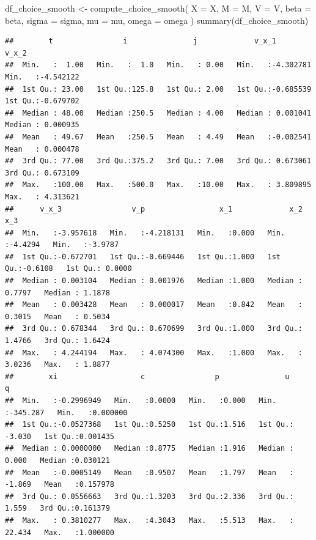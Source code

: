 \documentclass[
]{book}
\newenvironment{Shaded}{\begin{snugshade}}{\end{snugshade}}
\newcommand{\AttributeTok}[1]{\textcolor[rgb]{0.77,0.63,0.00}{#1}}
\newcommand{\FunctionTok}[1]{\textcolor[rgb]{0.00,0.00,0.00}{#1}}
\newcommand{\NormalTok}[1]{#1}
\newcommand{\OtherTok}[1]{\textcolor[rgb]{0.56,0.35,0.01}{#1}}
\begin{document}
\begin{Shaded}
\begin{Highlighting}[]
\NormalTok{df\_choice\_smooth }\OtherTok{\textless{}{-}}
  \FunctionTok{compute\_choice\_smooth}\NormalTok{(}
    \AttributeTok{X =}\NormalTok{ X, }
    \AttributeTok{M =}\NormalTok{ M, }
    \AttributeTok{V =}\NormalTok{ V, }
    \AttributeTok{beta =}\NormalTok{ beta, }
    \AttributeTok{sigma =}\NormalTok{ sigma, }
    \AttributeTok{mu =}\NormalTok{ mu, }
    \AttributeTok{omega =}\NormalTok{ omega}
\NormalTok{    )}
\FunctionTok{summary}\NormalTok{(df\_choice\_smooth)}
\end{Highlighting}
\end{Shaded}

\begin{verbatim}
##        t                i               j             v_x_1               v_x_2          
##  Min.   :  1.00   Min.   :  1.0   Min.   : 0.00   Min.   :-4.302781   Min.   :-4.542122  
##  1st Qu.: 23.00   1st Qu.:125.8   1st Qu.: 2.00   1st Qu.:-0.685539   1st Qu.:-0.679702  
##  Median : 48.00   Median :250.5   Median : 4.00   Median : 0.001041   Median : 0.000935  
##  Mean   : 49.67   Mean   :250.5   Mean   : 4.49   Mean   :-0.002541   Mean   : 0.000478  
##  3rd Qu.: 77.00   3rd Qu.:375.2   3rd Qu.: 7.00   3rd Qu.: 0.673061   3rd Qu.: 0.673109  
##  Max.   :100.00   Max.   :500.0   Max.   :10.00   Max.   : 3.809895   Max.   : 4.313621  
##      v_x_3                v_p                 x_1             x_2               x_3         
##  Min.   :-3.957618   Min.   :-4.218131   Min.   :0.000   Min.   :-4.4294   Min.   :-3.9787  
##  1st Qu.:-0.672701   1st Qu.:-0.669446   1st Qu.:1.000   1st Qu.:-0.6108   1st Qu.: 0.0000  
##  Median : 0.003104   Median : 0.001976   Median :1.000   Median : 0.7797   Median : 1.1878  
##  Mean   : 0.003428   Mean   : 0.000017   Mean   :0.842   Mean   : 0.3015   Mean   : 0.5034  
##  3rd Qu.: 0.678344   3rd Qu.: 0.670699   3rd Qu.:1.000   3rd Qu.: 1.4766   3rd Qu.: 1.6424  
##  Max.   : 4.244194   Max.   : 4.074300   Max.   :1.000   Max.   : 3.0236   Max.   : 1.8877  
##        xi                   c                p               u                  q           
##  Min.   :-0.2996949   Min.   :0.0000   Min.   :0.000   Min.   :-345.287   Min.   :0.000000  
##  1st Qu.:-0.0527368   1st Qu.:0.5250   1st Qu.:1.516   1st Qu.:  -3.030   1st Qu.:0.001435  
##  Median : 0.0000000   Median :0.8775   Median :1.916   Median :   0.000   Median :0.030121  
##  Mean   :-0.0005149   Mean   :0.9507   Mean   :1.797   Mean   :  -1.869   Mean   :0.157978  
##  3rd Qu.: 0.0556663   3rd Qu.:1.3203   3rd Qu.:2.336   3rd Qu.:   1.559   3rd Qu.:0.161379  
##  Max.   : 0.3810277   Max.   :4.3043   Max.   :5.513   Max.   :  22.434   Max.   :1.000000
\end{verbatim}
\end{document}
